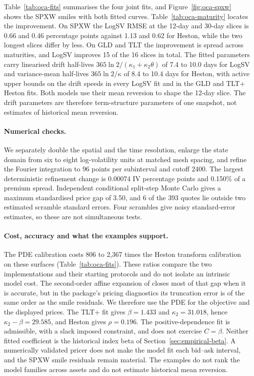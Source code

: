 \documentclass[11pt,a4paper]{article}
\theoremstyle{definition}
\theoremstyle{remark}
\newcommand{\positiveBeta}{1.433}
\newcommand{\positiveKappaTwo}{31.018}
\newcommand{\positiveMargin}{29.585}
\newcommand{\positiveHestonRho}{0.196}
\begin{document}
Table~\ref{tab:oca-fits} summarises the four joint fits, and
Figure~\ref{fig:oca-spxw} shows the SPXW smiles with both fitted curves.
Table~\ref{tab:oca-maturity} locates the improvement. On SPXW the LogSV RMSE at
the 12-day and 30-day slices is 0.66 and 0.46 percentage points against 1.13 and 0.62 for Heston, while the two longest slices differ by less. On GLD and TLT
the improvement is spread across maturities, and LogSV improves 15 of the 16 slices in total.
The fitted parameters carry linearised drift half-lives
$365\ln2/(\kappa_1+\kappa_2\theta)$ of 7.4 to 10.0 days for LogSV
and variance-mean half-lives $365\ln2/\kappa$ of 8.4 to 10.4 days for Heston, with active upper bounds on the drift speeds in
every LogSV fit and in the GLD and TLT+ Heston fits. Both models use their mean reversion to
shape the 12-day slice. The drift parameters are therefore term-structure parameters
of one snapshot, not estimates of historical mean reversion.

\paragraph{Numerical checks.}
We separately double the spatial and the time resolution, enlarge the state domain
from six to eight log-volatility units at matched mesh spacing, and refine the
Fourier integration to 96 points per subinterval and cutoff 2400.
The largest deterministic refinement change is 0.00074 IV percentage
points and 0.150\% of a premium spread. Independent conditional
split-step Monte Carlo gives a maximum standardised price gap of 3.50, and 6 of the 393 quotes lie outside two
estimated scramble standard errors. Four scrambles give noisy standard-error
estimates, so these are not simultaneous tests.

\paragraph{Cost, accuracy and what the examples support.}
The PDE calibration costs 806 to 2,367 times the Heston transform calibration on these surfaces
(Table~\ref{tab:oca-fits}). These ratios compare the two implementations and their
starting protocols and do not isolate an intrinsic model cost.
The second-order affine expansion of \citet{SeppRakhmonovLogSV} closes most of that
gap when it is accurate, but in the package's pricing diagnostics its truncation error is of
the same order as the smile residuals. We therefore
use the PDE for the objective and the displayed prices.
The TLT+ fit gives $\beta=\positiveBeta$ and $\kappa_2=\positiveKappaTwo$, hence
$\kappa_2-\beta=\positiveMargin$, and Heston gives $\rho=\positiveHestonRho$.
The positive-dependence fit is admissible, with a slack
imposed constraint, and does not exercise $C=\beta$. Neither fitted coefficient is
the historical index beta of Section~\ref{sec:empirical-beta}.
A numerically validated pricer does not make the model
fit each bid--ask interval, and the SPXW smile residuals remain material.
The examples do not rank the model
families across assets and do not estimate historical mean reversion.
\end{document}

